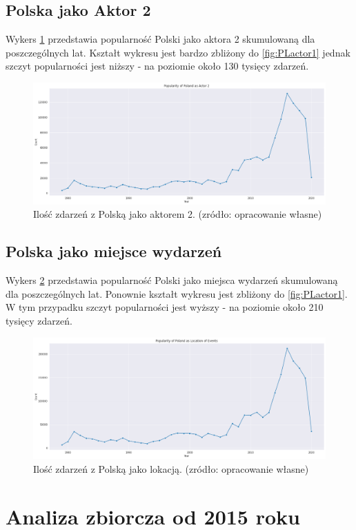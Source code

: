 \documentclass[11pt]{report}
\begin{document}
 \subsection{Polska jako Aktor 2}
 Wykers \ref{fig:PLactor2} przedstawia popularność Polski jako aktora 2 skumulowaną dla poszczególnych lat. Kształt wykresu jest bardzo zbliżony do \ref{fig:PLactor1} jednak szczyt popularności jest niższy - na poziomie około 130 tysięcy zdarzeń.
     \begin{figure}[ht]
	\centering
	\includegraphics[width=0.8 \textwidth]{fig/PL/PLactor2.png}
	\caption{Ilość zdarzeń z Polską jako aktorem 2. (zródło: opracowanie własne)}
	\label{fig:PLactor2}
	\end{figure}
	
 \subsection{Polska jako miejsce wydarzeń}
 Wykers \ref{fig:PLlocation} przedstawia popularność Polski jako miejsca wydarzeń skumulowaną dla poszczególnych lat. Ponownie kształt wykresu jest zbliżony do \ref{fig:PLactor1}. W tym przypadku szczyt popularności jest wyższy - na poziomie około 210 tysięcy zdarzeń.
     \begin{figure}[ht]
	\centering
	\includegraphics[width=0.8 \textwidth]{fig/PL/PLlocation.png}
	\caption{Ilość zdarzeń z Polską jako lokacją. (zródło: opracowanie własne)}
	\label{fig:PLlocation}
	\end{figure}

 \section{Analiza zbiorcza od 2015 roku}
\end{document}
